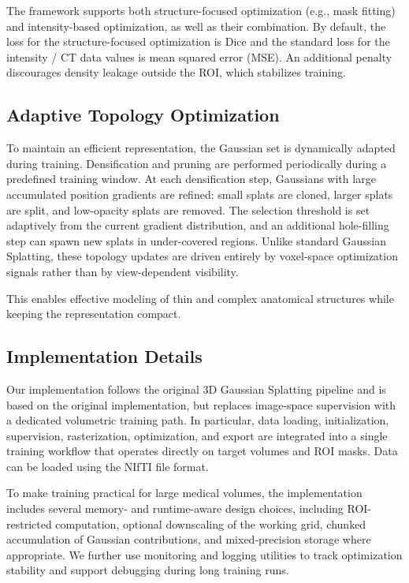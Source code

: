 \documentclass[runningheads]{llncs}
\begin{document}
The framework supports both structure-focused optimization (e.g., mask fitting) and intensity-based optimization, as well as their combination. By default, the loss for the structure-focused optimization is Dice and the standard loss for the intensity / CT data values is mean squared error (MSE). An additional penalty discourages density leakage outside the ROI, which stabilizes training.

\subsection{Adaptive Topology Optimization}
To maintain an efficient representation, the Gaussian set is dynamically adapted during training. Densification and pruning are performed periodically during a predefined training window. At each densification step, Gaussians with large accumulated position gradients are refined: small splats are cloned, larger splats are split, and low-opacity splats are removed. The selection threshold is set adaptively from the current gradient distribution, and an additional hole-filling step can spawn new splats in under-covered regions. Unlike standard Gaussian Splatting, these topology updates are driven entirely by voxel-space optimization signals rather than by view-dependent visibility.

This enables effective modeling of thin and complex anatomical structures while keeping the representation compact.

\subsection{Implementation Details}
Our implementation follows the original 3D Gaussian Splatting pipeline and is based on the original implementation, but replaces image-space supervision with a dedicated volumetric training path. In particular, data loading, initialization, supervision, rasterization, optimization, and export are integrated into a single training workflow that operates directly on target volumes and ROI masks. Data can be loaded using the NIfTI file format.

To make training practical for large medical volumes, the implementation includes several memory- and runtime-aware design choices, including ROI-restricted computation, optional downscaling of the working grid, chunked accumulation of Gaussian contributions, and mixed-precision storage where appropriate. We further use monitoring and logging utilities to track optimization stability and support debugging during long training runs.
\end{document}
